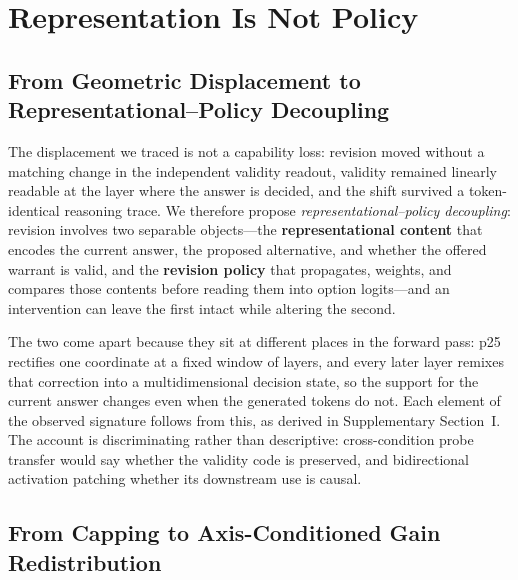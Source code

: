 \documentclass[letterpaper]{article} %
\begin{document}
\section{Representation Is Not Policy}
\label{sec:implications}

\subsection{From Geometric Displacement to Representational--Policy Decoupling}

The displacement we traced is not a capability loss: revision moved without a matching change in the independent validity readout, validity remained linearly readable at the layer where the answer is decided, and the shift survived a token-identical reasoning trace. We therefore propose \emph{representational--policy decoupling}: revision involves two separable objects---the \textbf{representational content} that encodes the current answer, the proposed alternative, and whether the offered warrant is valid, and the \textbf{revision policy} that propagates, weights, and compares those contents before reading them into option logits---and an intervention can leave the first intact while altering the second.

The two come apart because they sit at different places in the forward pass: p25 rectifies one coordinate at a fixed window of layers, and every later layer remixes that correction into a multidimensional decision state, so the support for the current answer changes even when the generated tokens do not. Each element of the observed signature follows from this, as derived in Supplementary Section~I. The account is discriminating rather than descriptive: cross-condition probe transfer would say whether the validity code is preserved, and bidirectional activation patching whether its downstream use is causal.

\subsection{From Capping to Axis-Conditioned Gain Redistribution}
\end{document}
